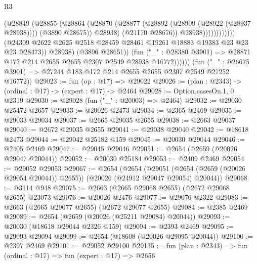 \begin{lexlean}{R3}
\begin{coremodule}
                                          (@28849
                                            (@28855
                                              (@28864
                                                (@28870
                                                  (@28877
                                                    (@28892 (@28909 (@28922 (@28937 @28938))))
                                                    (@3890 @28675))
                                                  @28938)
                                                (@21170 @28676))
                                              @28938))))))))))))
                      (@24309
                        @2622
                        @2625
                        @2518
                        @28459
                        @28461
                        @19261
                        @18883
                        @19383
                        @23
                        @23
                        @23
                        @28473))
                    @28938)
                  (@3896 @28651))
                (fun ("_" : @28380 @3901) =>
                @28871 @172 @214 @2655 @2655 @2307 @2549 @28938 @16772))))))
      (fun ("_" : @26675 @3901) => @27244 @183 @172 @214 @2655 @2655 @2307 @2549 @27252 @16772))
@29023 := fun (op : @17) => @29022
@29026 := (plan : @2343) -> (ordinal : @17) -> (expert : @17) -> @2464
@29028 := Option.casesOn.{1, 0} @2319
@29030 := @29028 (fun ("_" : @20003) => @2464)
@29032 := @29030 @25472 @2657
@29033 := @20026 @2473
@29034 := @2365 @2469
@29035 := @29033 @29034
@29037 := @2665 @29035 @2655
@29038 := @2663 @29037
@29040 := @2672 @29035 @2655
@29041 := @29038 @29040
@29042 := @18618 @2473
@29044 := @29042 @25182 @159
@29045 := @20030 @29044
@29046 := @2405 @2469
@29047 := @29045 @29046
@29051 := @2654 (@2659 (@20026 @29047 @20044))
@29052 := @20030 @25184
@29053 := @2409 @2469
@29054 := @29052 @29053
@29067 := @2654
    (@2654
      (@29051 (@2654 (@2659 (@20026 @29054 @20044)) @2655))
      (@20026 (@24912 @29047 @29054) @20044))
@29068 := @3114 @948
@29075 := @2663 (@2665 @29068 @2655) (@2672 @29068 @2655) @23073
@29076 := @20026 @2476
@29077 := @29076 @2322
@29083 := @2663 (@2665 @29077 @2655) (@2672 @29077 @2655)
@29084 := @2385 @2469
@29089 := @2654 (@2659 (@20026 (@25211 @29084) @20044))
@29093 := @20030 (@18618 @29044 @2326 @159)
@29094 := @2393 @2469
@29095 := @29093 @29094
@29099 := @2654 (@18608 (@20026 @29095 @20044))
@29100 := @2397 @2469
@29101 := @29052 @29100
@29135 := fun (plan : @2343) =>
  fun (ordinal : @17) =>
  fun (expert : @17) =>
  @2656

\end{coremodule}
\end{lexlean}
